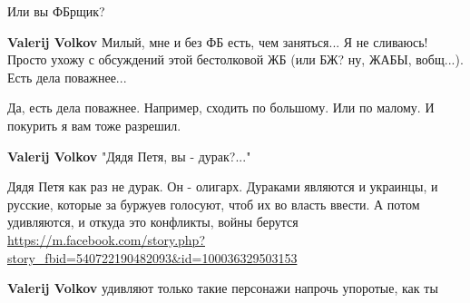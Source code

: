 \begin{itemize}
\begin{itemize}
Или вы ФБрщик?

 
\textbf{Valerij Volkov} Милый, мне и без ФБ есть, чем заняться... Я не
сливаюсь! Просто ухожу с обсуждений этой бестолковой ЖБ (или БЖ? ну, ЖАБЫ,
вобщ...). Есть дела поважнее...

 
Да, есть дела поважнее.
Например, сходить по большому. Или по малому.
И покурить я вам тоже разрешил.

 
\textbf{Valerij Volkov} "Дядя Петя, вы - дурак?..."

 
Дядя Петя как раз не дурак. Он - олигарх.
Дураками являются и украинцы, и русские, которые за буржуев голосуют, чтоб их во власть ввести. А потом удивляются, и откуда это конфликты, войны берутся
\url{https://m.facebook.com/story.php?story_fbid=540722190482093&id=100036329503153}

 
\textbf{Valerij Volkov} удивляют только такие персонажи напрочь упоротые, как ты

 

\end{itemize}
\end{itemize}
